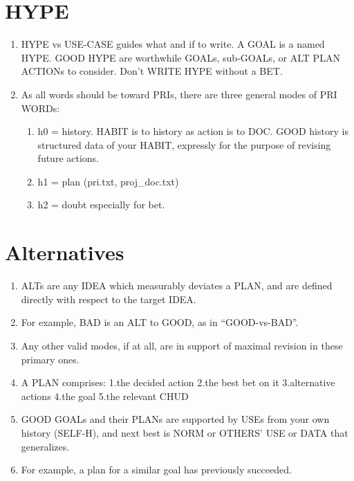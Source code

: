 \documentclass[
]{book}
\providecommand{\tightlist}{%
  \setlength{\itemsep}{0pt}\setlength{\parskip}{0pt}}
\begin{document}
\hypertarget{hype}{%
\section{HYPE}\label{hype}}

\begin{enumerate}
\def\labelenumi{\arabic{enumi}.}
\setcounter{enumi}{46}
\tightlist
\item
  HYPE vs USE-CASE guides what and if to write. A GOAL is a named
  HYPE. GOOD HYPE are worthwhile GOALs, sub-GOALs, or ALT PLAN ACTIONs
  to consider. Don't WRITE HYPE without a BET.
\item
  As all words should be toward PRIs, there are three general modes of
  PRI WORDs:

  \begin{enumerate}
  \def\labelenumii{\arabic{enumii}.}
  \tightlist
  \item
    h0 = history. HABIT is to history as action is to DOC. GOOD
    history is structured data of your HABIT, expressly for the
    purpose of revising future actions.
  \item
    h1 = plan (pri.txt, proj\_doc.txt)
  \item
    h2 = doubt especially for bet.
  \end{enumerate}
\end{enumerate}

\hypertarget{alternatives}{%
\section{Alternatives}\label{alternatives}}

\begin{enumerate}
\def\labelenumi{\arabic{enumi}.}
\setcounter{enumi}{48}
\item
  ALTs are any IDEA which measurably deviates a PLAN, and are defined
  directly with respect to the target IDEA.
\item
  For example, BAD is an ALT to GOOD, as in ``GOOD-vs-BAD''.
\item
  Any other valid modes, if at all, are in support of maximal revision
  in these primary ones.
\item
  A PLAN comprises: 1.the decided action 2.the best bet on it
  3.alternative actions 4.the goal 5.the relevant CHUD
\item
  GOOD GOALs and their PLANs are supported by USEs from your own
  history (SELF-H), and next best is NORM or OTHERS' USE or DATA that
  generalizes.
\item
  For example, a plan for a similar goal has previously succeeded.
\end{enumerate}
\end{document}
